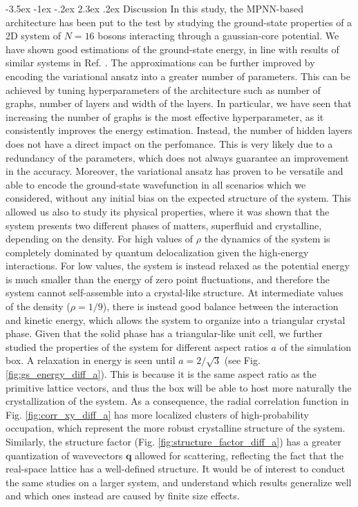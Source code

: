 \documentclass[a4paper, 12pt, oneside]{article}
\makeatletter
\renewcommand{\section}{\@startsection{section}{1}{\z@}%
             {-3.5ex \@plus-1ex \@minus-.2ex}%
             {2.3ex \@plus.2ex}%
             {\normalfont\large\bfseries}}
\makeatother
\begin{document}
\section{Discussion}
In this study, the MPNN-based architecture has been put to the test by studying the ground-state 
properties of a 2D system of $N=16$ bosons interacting through a gaussian-core potential. We have shown good 
estimations of the ground-state energy, in line with results of similar systems in Ref. \cite{pescia_2022}. The approximations can be further improved by encoding the variational ansatz into a 
greater number of parameters. This can be achieved by tuning hyperparameters of the architecture 
such as number of graphs, number of layers and width of the layers. In particular, we have seen that 
increasing the number of graphs is the most effective hyperparameter, as it consistently improves the energy 
estimation. Instead, the number of hidden layers does not have a direct impact on the perfomance.
This is very likely due to a redundancy of the parameters, which does not always guarantee an improvement in the accuracy.  Moreover, the variational ansatz has proven to be versatile and able to encode the 
ground-state wavefunction in all scenarios which we considered, without any initial bias on the expected 
structure of the system. This allowed us also to study its physical properties, where it was shown 
that the system presents two different phases of matters, superfluid and crystalline, depending 
on the density. For high values of $\rho$ the 
dynamics of the system is completely dominated by quantum delocalization given the high-energy 
interactions. For low values, the system is instead relaxed as the potential energy is much smaller than the
energy of zero point fluctuations, and therefore the system cannot self-assemble into a crystal-like 
structure. At intermediate values of the density ($\rho=1/9$), there is instead good balance between 
the interaction and kinetic energy, which allows the system to organize into a triangular crystal phase.
Given that the solid phase has a triangular-like unit cell, we further studied the properties of the 
system for different aspect ratios $a$ of the simulation box. A relaxation in energy 
is seen until $a=2/\sqrt{3}$ (see Fig. \ref{fig:gs_energy_diff_a}). This is because it is the same 
aspect ratio as the primitive lattice vectors, and thus the box will be able to host more naturally 
the crystallization of the system. As a consequence, the radial correlation function in 
Fig. \ref{fig:corr_xy_diff_a} has more localized clusters of 
high-probability occupation, which represent the more robust crystalline structure of the system. 
Similarly, the structure factor (Fig. \ref{fig:structure_factor_diff_a}) has a greater quantization of 
wavevectors $\bm{q}$ allowed for scattering, reflecting the fact that the real-space lattice has a 
well-defined structure. It would be of interest to conduct the same studies on a larger system, and understand 
which results generalize well and which ones instead are caused by finite size effects.
\end{document}
